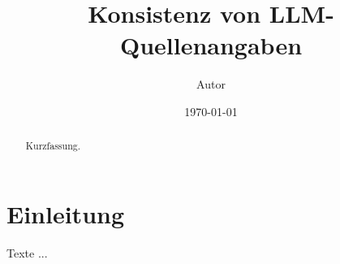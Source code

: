 \documentclass{article}
\title{Konsistenz von LLM-Quellenangaben}
\author{Autor}
\date{\today}
\begin{document}
\maketitle
\begin{abstract}
Kurzfassung.
\end{abstract}
\section{Einleitung}
Texte ...
\end{document}
